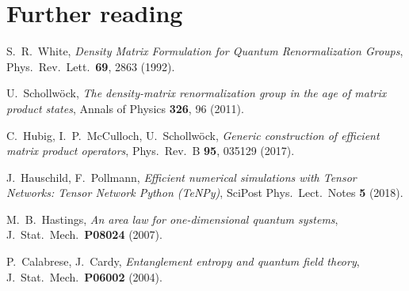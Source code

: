 \documentclass[11pt,a4paper]{article}
\theoremstyle{plain}
\theoremstyle{definition}
\theoremstyle{remark}
\begin{document}
\section*{Further reading}

\begin{enumerate}[label={[\arabic*]},leftmargin=2.2em]
\item S.~R.~White, \emph{Density Matrix Formulation for Quantum Renormalization
      Groups}, Phys.\ Rev.\ Lett.\ \textbf{69}, 2863 (1992).
\item U.~Schollw\"ock, \emph{The density-matrix renormalization group in the
      age of matrix product states}, Annals of Physics \textbf{326}, 96 (2011).
\item C.~Hubig, I.~P.~McCulloch, U.~Schollw\"ock, \emph{Generic construction
      of efficient matrix product operators}, Phys.\ Rev.\ B \textbf{95},
      035129 (2017).
\item J.~Hauschild, F.~Pollmann, \emph{Efficient numerical simulations with
      Tensor Networks: Tensor Network Python (TeNPy)}, SciPost Phys.\ Lect.\
      Notes \textbf{5} (2018).
\item M.~B.~Hastings, \emph{An area law for one-dimensional quantum systems},
      J.\ Stat.\ Mech.\ \textbf{P08024} (2007).
\item P.~Calabrese, J.~Cardy, \emph{Entanglement entropy and quantum field
      theory}, J.\ Stat.\ Mech.\ \textbf{P06002} (2004).
\end{enumerate}
\end{document}
